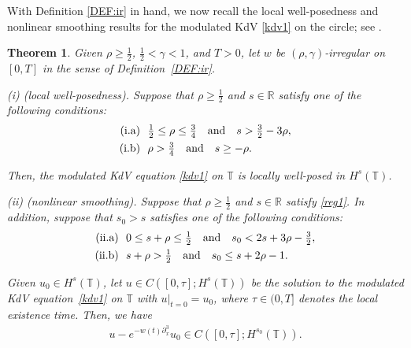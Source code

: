 \documentclass[letterpaper, 11pt,  reqno]{amsart}
\newtheorem{oldtheorem}{Theorem}
\newcommand{\1}{\hspace{0.5mm}\textup{I}\hspace{0.5mm}}
\newcommand{\noi}{\noindent}
\newcommand{\R}{\mathbb{R}}
\newcommand{\T}{\mathbb{T}}
\newcommand{\g}{\gamma}
\newcommand{\dx}{\partial_x}
\numberwithin{equation}{section}
\numberwithin{theorem}{section}
\begin{document}
With Definition \ref{DEF:ir} in hand, 
we now recall the local well-posedness
and nonlinear smoothing results for  the modulated KdV \eqref{kdv1} on the circle;
see 
 \cite[Theorems 1.3 and 1.15]{CGLLO1}.







\begin{oldtheorem}\label{THM:B}
Given $\rho \ge\frac 12$,  $\frac12< \g < 1$, and $T> 0$, 
let  $w$ be $(\rho,\g)$-irregular on $[0, T]$ in the sense of Definition~\ref{DEF:ir}.

\smallskip

\noi
\textup{(i) (local well-posedness).}
Suppose that $\rho \ge \frac 12$ and $s\in \R$
satisfy one of the following conditions\textup{:}
\begin{align}
\begin{split}
\textup{(i.a)} &\ \  \tfrac 12 \le \rho \le \tfrac 34 \quad \text{and} \quad 
s > \tfrac 32 - 3 \rho, \\
\textup{(i.b)} &\ \  \rho > \tfrac 34\quad  \text{and} \quad  s \ge - \rho.
\end{split}
\label{reg1}
\end{align}

\noi
Then, the modulated KdV equation \eqref{kdv1}
on  $\T$
is locally well-posed in $H^s(\T)$.








\smallskip

\noi
\textup{(ii) (nonlinear smoothing).}
Suppose that $\rho \ge \frac 12$ and $s\in \R$
satisfy 
 \eqref{reg1}.
In addition, 
suppose that $s_0 > s$ satisfies 
 one of the following conditions\textup{:}
\begin{align}
\begin{split}
\textup{(ii.a)} &\ \  
0 \le s + \rho \le  \tfrac 12
 \quad \text{and} \quad 
s_0 < 2s +  3\rho - \tfrac 32, \\
\textup{(ii.b)} &\ \  
s + \rho >  \tfrac 12 
\quad  \text{and} \quad s_0 \le s + 2\rho - 1.
\end{split}
\label{reg3}
\end{align}




\noi
Given $u_0 \in H^s(\T)$, 
let $u
\in C([0, \tau]; H^s(\T))$ be the  solution 
to the modulated KdV equation~\eqref{kdv1}
on $\T$
with $u|_{t = 0} = u_0$, 
where 
$\tau \in (0,  T]$ denotes the local existence time.
Then, we have 
\begin{align*}
 u - e^{-w(t) \dx^3}u_0 \in C([0, \tau]; H^{s_0}(\T)).
\end{align*}

\end{oldtheorem}
\end{document}
